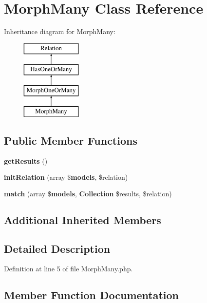 \section{Morph\+Many Class Reference}
\label{class_illuminate_1_1_database_1_1_eloquent_1_1_relations_1_1_morph_many}
Inheritance diagram for Morph\+Many\+:\begin{figure}[H]
\begin{center}
\leavevmode
\includegraphics[height=4.000000cm]{class_illuminate_1_1_database_1_1_eloquent_1_1_relations_1_1_morph_many}
\end{center}
\end{figure}
\subsection*{Public Member Functions}
\begin{DoxyCompactItemize}
\item 
{\bf get\+Results} ()
\item 
{\bf init\+Relation} (array \${\bf models}, \$relation)
\item 
{\bf match} (array \${\bf models}, {\bf Collection} \$results, \$relation)
\end{DoxyCompactItemize}
\subsection*{Additional Inherited Members}


\subsection{Detailed Description}


Definition at line 5 of file Morph\+Many.\+php.



\subsection{Member Function Documentation}
